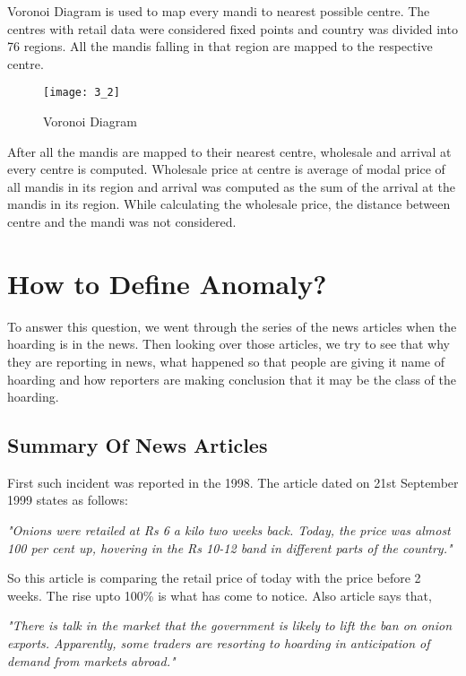 Voronoi Diagram is used to map every mandi to nearest possible centre. The centres with retail data were considered fixed points and country was divided into 76 regions. All the mandis falling in that region are mapped to the respective centre.


\begin{figure}[h]
\begin{center}    
\texttt{[image: 3\_2]}
\caption{Voronoi Diagram}
\label{fig:Voronoi Diagram}
\end{center}
\end{figure}


After all the mandis are mapped to their nearest centre, wholesale and arrival at every centre is computed. Wholesale price at centre is average of modal price of all mandis in its region and arrival was computed as the sum of the arrival at the mandis in its region. While calculating the wholesale price, the distance between centre and the mandi was not considered.

\section{How to Define Anomaly?}

To answer this question, we went through the series of the news articles when the hoarding is in the news. Then looking over those articles, we try to see that why they are reporting in news, what happened so that people are giving it name of hoarding and how reporters are making conclusion that it may be the class of the hoarding.

\subsection{Summary Of News Articles}


First such incident was reported in the 1998. The article \cite{Redif57:online} dated on 21st September 1999 states as follows:

\textit{"Onions were retailed at Rs 6 a kilo two weeks back. Today, the price was almost 100 per cent up, hovering in the Rs 10-12 band in different parts of the country."}

So this article is comparing the retail price of today with the price before 2 weeks. The rise upto 100\% is what has come to notice. Also article says that,

\textit{"There is talk in the market that the government is likely to lift the ban on onion exports. Apparently, some traders are resorting to hoarding in anticipation of demand from markets abroad."}

